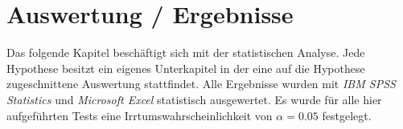 \documentclass[a4paper,11pt]{article}%
\renewcommand{\\}{\vspace*{0.5\baselineskip} \newline}
\begin{document}
%    
%    
%    
%    
%    
%


\clearpage
\section{Auswertung / Ergebnisse}
Das folgende Kapitel beschäftigt sich mit der statistischen Analyse. Jede Hypothese besitzt ein eigenes Unterkapitel in der eine auf die Hypothese zugeschnittene Auswertung stattfindet.
Alle Ergebnisse wurden mit \textit{IBM SPSS Statistics} und \textit{Microsoft Excel} statistisch ausgewertet. 
Es wurde für alle hier aufgeführten Tests eine Irrtumswahrscheinlichkeit von $\alpha = 0.05$ festgelegt.
\end{document}
